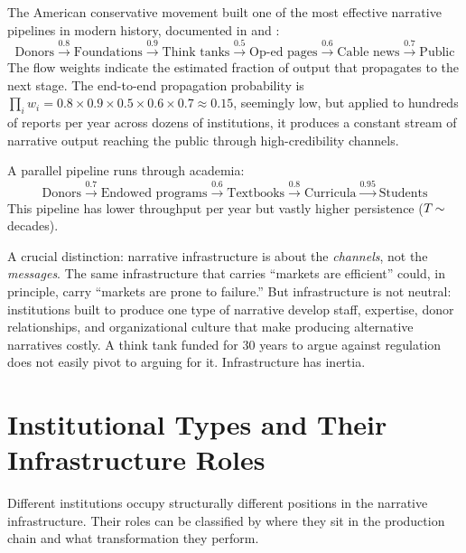 \begin{example}
\label{ex:conservative-pipeline}
The American conservative movement built one of the most effective narrative pipelines in modern history, documented in \textcite{mayer2016} and \textcite{mirowski2009}:
\[
  \text{Donors} \xrightarrow{0.8} \text{Foundations} \xrightarrow{0.9} \text{Think tanks} \xrightarrow{0.5} \text{Op-ed pages} \xrightarrow{0.6} \text{Cable news} \xrightarrow{0.7} \text{Public}
\]
The flow weights indicate the estimated fraction of output that propagates to the next stage.
The end-to-end propagation probability is $\prod_i w_i = 0.8 \times 0.9 \times 0.5 \times 0.6 \times 0.7 \approx 0.15$, seemingly low, but applied to hundreds of reports per year across dozens of institutions, it produces a constant stream of narrative output reaching the public through high-credibility channels.

A parallel pipeline runs through academia:
\[
  \text{Donors} \xrightarrow{0.7} \text{Endowed programs} \xrightarrow{0.6} \text{Textbooks} \xrightarrow{0.8} \text{Curricula} \xrightarrow{0.95} \text{Students}
\]
This pipeline has lower throughput per year but vastly higher persistence ($T_{} \sim$ decades).
\end{example}

\begin{remark}
\label{rem:infra-content}
A crucial distinction: narrative infrastructure is about the \emph{channels}, not the \emph{messages}.
The same infrastructure that carries ``markets are efficient'' could, in principle, carry ``markets are prone to failure.''
But infrastructure is not neutral: institutions built to produce one type of narrative develop staff, expertise, donor relationships, and organizational culture that make producing alternative narratives costly.
A think tank funded for 30 years to argue against regulation does not easily pivot to arguing for it.
Infrastructure has inertia.
\end{remark}


\section{Institutional Types and Their Infrastructure Roles}
\label{sec:ch7-types}

Different institutions occupy structurally different positions in the narrative infrastructure.
Their roles can be classified by where they sit in the production chain and what transformation they perform.

